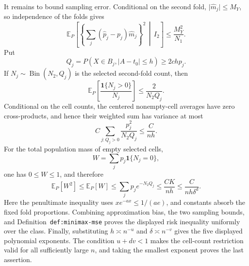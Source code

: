 It remains to bound sampling error. Conditional on the second fold, \(\lvert\widehat m_j\rvert\le M_Y\), so independence of the folds gives
\[
\mathbb E_P\left[
\left\{\sum_j(\widehat p_j-p_j)\widehat m_j\right\}^2
\,\middle|\,I_2\right]
\le \frac{M_Y^2}{N_1}.
\]
Put
\[
Q_j=P(X\in B_j,\lvert A-t_0\rvert\le h)\ge2chp_j.
\]
If \(N_j\sim\operatorname{Bin}(N_2,Q_j)\) is the selected second-fold count, then
\[
\mathbb E_P\left[\frac{\mathbf1\{N_j>0\}}{N_j}\right]
\le\frac{2}{N_2Q_j}.
\]
Conditional on the cell counts, the centered nonempty-cell averages have zero cross-products, and hence their weighted sum has variance at most
\[
C\sum_{j:Q_j>0}\frac{p_j^2}{N_2Q_j}
\le\frac{C}{nh}.
\]
For the total population mass of empty selected cells,
\[
W=\sum_jp_j\mathbf1\{N_j=0\},
\]
one has \(0\le W\le1\), and therefore
\[
\mathbb E_P[W^2]
\le\mathbb E_P[W]
\le\sum_jp_j e^{-N_2Q_j}
\le\frac{CK}{nh}
\le\frac{C}{nh\delta^d}.
\]
Here the penultimate inequality uses \(x e^{-a x}\le1/(ae)\), and constants absorb the fixed fold proportions. Combining approximation bias, the two sampling bounds, and Definition~\texttt{def:minimax-mse} proves the displayed risk inequality uniformly over the class. Finally, substituting \(h\asymp n^{-u}\) and \(\delta\asymp n^{-v}\) gives the five displayed polynomial exponents. The condition \(u+dv<1\) makes the cell-count restriction valid for all sufficiently large \(n\), and taking the smallest exponent proves the last assertion.